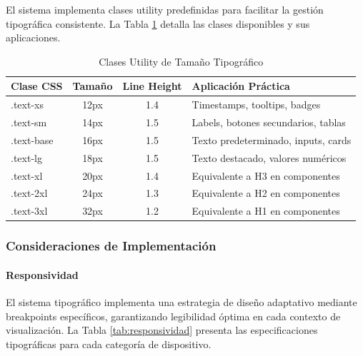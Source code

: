 \documentclass[12pt,a4paper,oneside]{article}
\begin{document}
El sistema implementa clases utility predefinidas para facilitar la gestión tipográfica consistente. La Tabla \ref{tab:text-classes} detalla las clases disponibles y sus aplicaciones.

\begin{table}[h]
\centering
\caption{Clases Utility de Tamaño Tipográfico}
\label{tab:text-classes}
\begin{tabular}{|l|c|c|p{5cm}|}
\hline
\textbf{Clase CSS} & \textbf{Tamaño} & \textbf{Line Height} & \textbf{Aplicación Práctica} \\
\hline
.text-xs & 12px & 1.4 & Timestamps, tooltips, badges \\
\hline
.text-sm & 14px & 1.5 & Labels, botones secundarios, tablas \\
\hline
.text-base & 16px & 1.5 & Texto predeterminado, inputs, cards \\
\hline
.text-lg & 18px & 1.5 & Texto destacado, valores numéricos \\
\hline
.text-xl & 20px & 1.4 & Equivalente a H3 en componentes \\
\hline
.text-2xl & 24px & 1.3 & Equivalente a H2 en componentes \\
\hline
.text-3xl & 32px & 1.2 & Equivalente a H1 en componentes \\
\hline
\end{tabular}
\end{table}

\subsubsection{Consideraciones de Implementación}

\paragraph{Responsividad}
El sistema tipográfico implementa una estrategia de diseño adaptativo mediante breakpoints específicos, garantizando legibilidad óptima en cada contexto de visualización. La Tabla \ref{tab:responsividad} presenta las especificaciones tipográficas para cada categoría de dispositivo.
\end{document}
